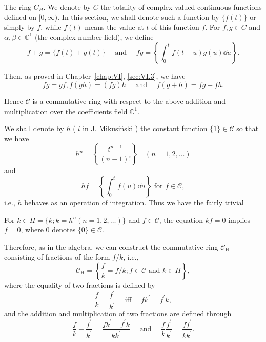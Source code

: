 The ring $C_{H}$. We denote by $C$ the totality of complex-valued continuous functions defined on $[0,\infty)$. In this section, we shall denote such a function by $\{f(t)\}$ or simply by $f$, while $f(t)$ means the value at $t$ of this function $f$. For $f, g \in C$ and $\alpha, \beta \in \mathbb{C}^{1}$ (the complex number field), we define 
\begin{equation}\label{eq:VI.6.1}
f + g = \{f (t) + g (t) \} \quad \text{ and } \quad f g = \left\{\int_{0} ^{t} f (t - u) g (u) \dd u \right\}.
\end{equation}

Then, as proved in Chapter~\ref{chap:VI}, \ref{sec:VI.3}, we have 
\[
f g = g f, f (g h) = (f g) h \quad \text{ and } \quad f (g + h) = f g + f h.
\]

Hence $\mathcal{C}$ is a commutative ring with respect to the above addition and multiplication over the coefficients field $\mathbb{C}^{1}$. 

We shall denote by $h$ ( $l$ in J. Mikusiński \cite{mikusinski196}) the constant function $\{1\} \in \mathcal{C}$ so that we have 
\begin{equation}\label{eq:VI.6.2}
h ^{n} = \left\{\frac {t ^{n-1}}{(n - 1) !} \right\} \quad (n = 1, 2, \dots)
\end{equation}
and 
\begin{equation}\label{eq:VI.6.3}
h f = \left\{\int_{0} ^{t} f (u) \dd u \right\} \text{ for } f \in \mathscr {C},
\end{equation}
i.e., $h$ behaves as an operation of integration. Thus we have the fairly trivial 

\begin{proposition}\label{prop:VI.6.Proposition.1} For $k \in H = \{k; k = h^n (n = 1, 2, \ldots)\}$ and $f \in \mathcal{C}$, the equation $kf = 0$ implies $f = 0$, where $0$ denotes $\{0\} \in \mathcal{C}$. 
\end{proposition}

Therefore, as in the algebra, we can construct the commutative ring $\mathcal{C}_{\mathrm{H}}$ consisting of fractions of the form $f / k$, i.e., 
\begin{equation}\label{eq:VI.6.4}
\mathcal {C} _ {\mathrm{H}} = \left\{\frac {f}{k} = f / k; f \in \mathcal {C} \text{ and } k \in H \right\},
\end{equation}
where the equality of two fractions is defined by 
\begin{equation}\label{eq:VI.6.5}
\frac {f}{k} = \frac {f ^{\prime}}{k ^{\prime}} \quad \text{ iff } \quad f k ^{\prime} = f ^{\prime} k ,
\end{equation}
and the addition and multiplication of two fractions are defined through 
\begin{equation}\label{eq:VI.6.6}
\frac {f}{k} + \frac {f ^{\prime}}{k ^{\prime}} = \frac {f k ^{\prime} + f ^{\prime} k}{k k ^{\prime}} \quad \text{ and } \quad \frac {f}{k} \frac {f ^{\prime}}{k ^{\prime}} = \frac {f f ^{\prime}}{k k ^{\prime}}.
\end{equation}

